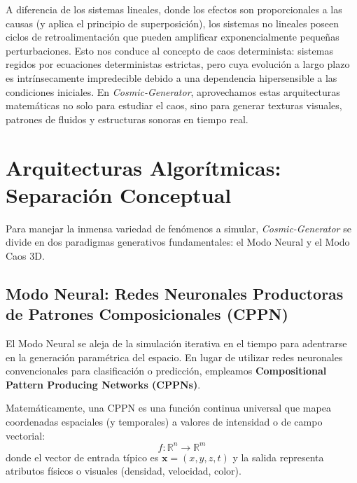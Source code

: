 \documentclass[12pt, openany]{book}
\begin{document}
A diferencia de los sistemas lineales, donde los efectos son proporcionales a las causas (y aplica el principio de superposición), los sistemas no lineales poseen ciclos de retroalimentación que pueden amplificar exponencialmente pequeñas perturbaciones. Esto nos conduce al concepto de caos determinista: sistemas regidos por ecuaciones deterministas estrictas, pero cuya evolución a largo plazo es intrínsecamente impredecible debido a una dependencia hipersensible a las condiciones iniciales. En \textit{Cosmic-Generator}, aprovechamos estas arquitecturas matemáticas no solo para estudiar el caos, sino para generar texturas visuales, patrones de fluidos y estructuras sonoras en tiempo real.

\section{Arquitecturas Algorítmicas: Separación Conceptual}

Para manejar la inmensa variedad de fenómenos a simular, \textit{Cosmic-Generator} se divide en dos paradigmas generativos fundamentales: el Modo Neural y el Modo Caos 3D. 

\subsection{Modo Neural: Redes Neuronales Productoras de Patrones Composicionales (CPPN)}

El Modo Neural se aleja de la simulación iterativa en el tiempo para adentrarse en la generación paramétrica del espacio. En lugar de utilizar redes neuronales convencionales para clasificación o predicción, empleamos \textbf{Compositional Pattern Producing Networks (CPPNs)}. 

Matemáticamente, una CPPN es una función continua universal que mapea coordenadas espaciales (y temporales) a valores de intensidad o de campo vectorial:
\begin{equation}
    f : \mathbb{R}^n \rightarrow \mathbb{R}^m
\end{equation}
donde el vector de entrada típico es $\mathbf{x} = (x, y, z, t)$ y la salida representa atributos físicos o visuales (densidad, velocidad, color).
\end{document}
